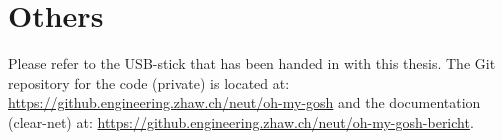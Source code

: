 \documentclass[10pt,a4paper,titlepage,twoside,english,final]{zhawreprt}
\begin{document}
\section{Others}\label{sec:Others}
Please refer to the USB-stick that has been handed in with this thesis.
The Git repository for the code (private) is located at:
\url{https://github.engineering.zhaw.ch/neut/oh-my-gosh}
and the documentation (clear-net) at:
\url{https://github.engineering.zhaw.ch/neut/oh-my-gosh-bericht}.
\end{document}
